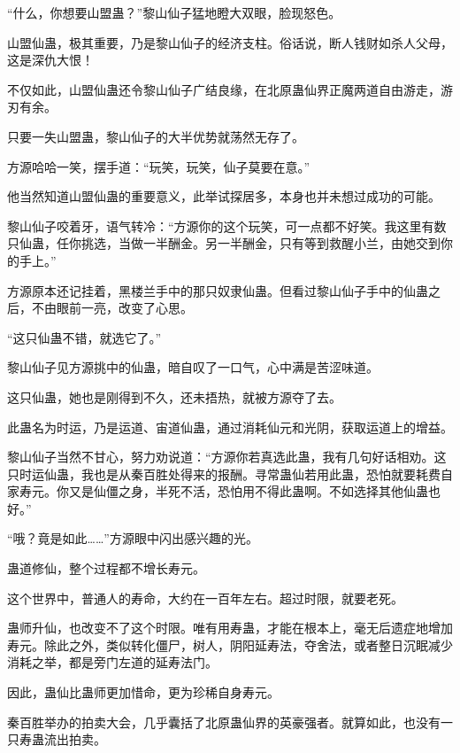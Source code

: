 
\begin{this_body}



“什么，你想要山盟蛊？”黎山仙子猛地瞪大双眼，脸现怒色。

山盟仙蛊，极其重要，乃是黎山仙子的经济支柱。俗话说，断人钱财如杀人父母，这是深仇大恨！

不仅如此，山盟仙蛊还令黎山仙子广结良缘，在北原蛊仙界正魔两道自由游走，游刃有余。

只要一失山盟蛊，黎山仙子的大半优势就荡然无存了。

方源哈哈一笑，摆手道：“玩笑，玩笑，仙子莫要在意。”

他当然知道山盟仙蛊的重要意义，此举试探居多，本身也并未想过成功的可能。

黎山仙子咬着牙，语气转冷：“方源你的这个玩笑，可一点都不好笑。我这里有数只仙蛊，任你挑选，当做一半酬金。另一半酬金，只有等到救醒小兰，由她交到你的手上。”

方源原本还记挂着，黑楼兰手中的那只奴隶仙蛊。但看过黎山仙子手中的仙蛊之后，不由眼前一亮，改变了心思。

“这只仙蛊不错，就选它了。”

黎山仙子见方源挑中的仙蛊，暗自叹了一口气，心中满是苦涩味道。

这只仙蛊，她也是刚得到不久，还未捂热，就被方源夺了去。

此蛊名为时运，乃是运道、宙道仙蛊，通过消耗仙元和光阴，获取运道上的增益。

黎山仙子当然不甘心，努力劝说道：“方源你若真选此蛊，我有几句好话相劝。这只时运仙蛊，我也是从秦百胜处得来的报酬。寻常蛊仙若用此蛊，恐怕就要耗费自家寿元。你又是仙僵之身，半死不活，恐怕用不得此蛊啊。不如选择其他仙蛊也好。”

“哦？竟是如此……”方源眼中闪出感兴趣的光。

蛊道修仙，整个过程都不增长寿元。

这个世界中，普通人的寿命，大约在一百年左右。超过时限，就要老死。

蛊师升仙，也改变不了这个时限。唯有用寿蛊，才能在根本上，毫无后遗症地增加寿元。除此之外，类似转化僵尸，树人，阴阳延寿法，夺舍法，或者整日沉眠减少消耗之举，都是旁门左道的延寿法门。

因此，蛊仙比蛊师更加惜命，更为珍稀自身寿元。

秦百胜举办的拍卖大会，几乎囊括了北原蛊仙界的英豪强者。就算如此，也没有一只寿蛊流出拍卖。


\end{this_body}
